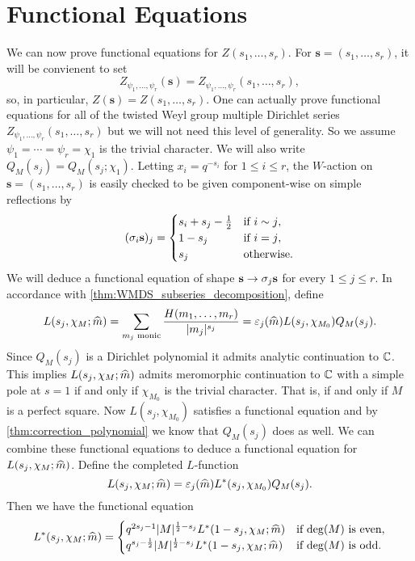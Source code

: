 \section{Functional Equations}
    We can now prove functional equations for $Z(s_{1},\ldots,s_{r})$. For $\mathbf{s} = (s_{1},\ldots,s_{r})$, it will be convienent to set
    \[
        Z_{\psi_{1},\ldots,\psi_{r}}(\mathbf{s}) = Z_{\psi_{1},\ldots,\psi_{r}}(s_{1},\ldots,s_{r}),
    \]
    so, in particular, $Z(\mathbf{s}) = Z(s_{1},\ldots,s_{r})$. One can actually prove functional equations for all of the twisted Weyl group multiple Dirichlet series $Z_{\psi_{1},\ldots,\psi_{r}}(s_{1},\ldots,s_{r})$ but we will not need this level of generality. So we assume $\psi_{1} = \cdots = \psi_{r} = \chi_{1}$ is the trivial character. We will also write $Q_{M}(s_{j}) = Q_{M}(s_{j};\chi_{1})$. Letting $x_{i} = q^{-s_{i}}$ for $1 \le i \le r$, the $W$-action on $\mathbf{s} = (s_{1},\ldots,s_{r})$ is easily checked to be given component-wise on simple reflections by
    \[
        (\sigma_{i}\mathbf{s})_{j} = \begin{cases} s_{i}+s_{j}-\frac{1}{2} & \text{if $i \sim j$}, \\ 1-s_{j} & \text{if $i = j$}, \\ s_{j} & \text{otherwise}.  \end{cases}
    \]
    We will deduce a functional equation of shape $\mathbf{s} \to \sigma_{j}\mathbf{s}$ for every $1 \le j \le r$. In accordance with \cref{thm:WMDS_subseries_decomposition}, define
    \[
        L(s_{j},\chi_{M};\widehat{m}) = \sum_{\text{$m_{j}$ monic}}\frac{H(m_{1},\ldots,m_{r})}{|m_{j}|^{s_{j}}} = \varepsilon_{j}(\widehat{m})L(s_{j},\chi_{M_{0}})Q_{M}(s_{j}).
    \]
    Since $Q_{M}(s_{j})$ is a Dirichlet polynomial it admits analytic continuation to $\mathbb{C}$. This implies $L(s_{j},\chi_{M};\widehat{m})$ admits meromorphic continuation to $\mathbb{C}$ with a simple pole at $s = 1$ if and only if $\chi_{M_{0}}$ is the trivial character. That is, if and only if $M$ is a perfect square. Now $L(s_{j},\chi_{M_{0}})$ satisfies a functional equation and by \cref{thm:correction_polynomial} we know that $Q_{M}(s_{j})$ does as well. We can combine these functional equations to deduce a functional equation for $L(s_{j},\chi_{M};\widehat{m})$. Define the completed $L$-function
    \[
        L(s_{j},\chi_{M};\widehat{m}) = \varepsilon_{j}(\widehat{m})L^{\ast}(s_{j},\chi_{M_{0}})Q_{M}(s_{j}).
    \]
    Then we have the functional equation
    \[
        L^{\ast}(s_{j},\chi_{M};\widehat{m}) = \begin{cases} q^{2s_{j}-1}|M|^{\frac{1}{2}-s_{j}}L^{\ast}(1-s_{j},\chi_{M};\widehat{m}) & \text{if $\deg(M)$ is even}, \\ q^{s_{j}-\frac{1}{2}}|M|^{\frac{1}{2}-s_{j}}L^{\ast}(1-s_{j},\chi_{M};\widehat{m}) & \text{if $\deg(M)$ is odd}. \end{cases}
    \]
